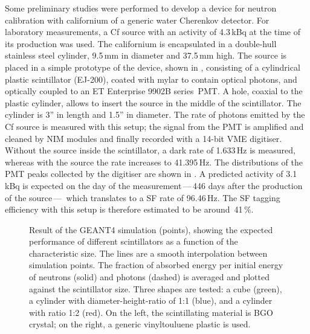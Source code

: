 Some preliminary studies were performed to develop a device for neutron calibration %
with californium of a generic water Cherenkov detector.
For laboratory measurements, a Cf source with an activity of 4.3\,kBq at the time of its production was used.
The californium is encapsulated in a double-hull stainless steel cylinder, 9.5\,mm in diameter and 37.5\,mm high.
The source is placed in a simple prototype of the device, shown in , %
consisting of a cylindrical plastic scintillator (EJ-200), coated with mylar to contain optical photons, %
and optically coupled to an ET Enterprise 9902B series~PMT.
A hole, coaxial to the plastic cylinder, allows to insert the source in the middle of the scintillator.
The cylinder is 3'' in length and 1.5'' in diameter.
The rate of photons emitted by the Cf source is measured with this setup; %
the signal from the PMT is amplified and cleaned by NIM modules and finally recorded with a 14-bit VME digitiser.
Without the source inside the scintillator, a dark rate of 1.633\,Hz is measured, %
whereas with the source the rate increases to 41.395\,Hz.
The distributions of the PMT peaks collected by the digitiser are shown in .
A predicted activity of 3.1\,kBq is expected on the day of the measurement\,---\,446 days after the production of the source\,---\, %
which translates to a SF rate of 96.46\,Hz.
The SF tagging efficiency with this setup is therefore estimated to be around~41\,\%.

\begin{figure}
	\centering
	\resizebox{\textwidth}{!}{}
	\caption[Performance of different scintillators from the simulation of a neutron calibration device]%
	{Result of the GEANT4 simulation (points), showing the expected performance of different scintillators %
		as a function of the characteristic size.
		The lines are a smooth interpolation between simulation points.
		The fraction of absorbed energy per initial energy of neutrons (solid) and photons (dashed) %
		is averaged and plotted against the scintillator size.
		Three shapes are tested: a cube (green), a cylinder with diameter-height-ratio of 1:1 (blue), %
		and a cylinder with ratio 1:2 (red).
		On the left, the scintillating material is BGO crystal; on the right, %
		a generic vinyltouluene plastic is used.}
	\label{fig:geant4}
\end{figure}




